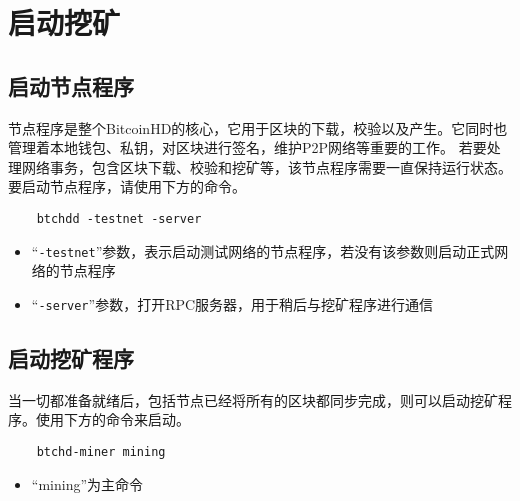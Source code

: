\section{启动挖矿}
\subsection{启动节点程序}
\begin{flushleft}
    节点程序是整个BitcoinHD的核心，它用于区块的下载，校验以及产生。它同时也管理着本地钱包、私钥，对区块进行签名，维护P2P网络等重要的工作。
    若要处理网络事务，包含区块下载、校验和挖矿等，该节点程序需要一直保持运行状态。要启动节点程序，请使用下方的命令。
\end{flushleft}
\scriptsize
\begin{verbatim}
    btchdd -testnet -server
\end{verbatim}
\normalsize
\begin{itemize}
    \item ``\texttt{-testnet}''参数，表示启动测试网络的节点程序，若没有该参数则启动正式网络的节点程序
    \item ``\texttt{-server}''参数，打开RPC服务器，用于稍后与挖矿程序进行通信
\end{itemize}
\subsection{启动挖矿程序}
\begin{flushleft}
    当一切都准备就绪后，包括节点已经将所有的区块都同步完成，则可以启动挖矿程序。使用下方的命令来启动。
\end{flushleft}
\scriptsize
\begin{verbatim}
    btchd-miner mining
\end{verbatim}
\normalsize
\begin{itemize}
    \item ``mining''为主命令
\end{itemize}
